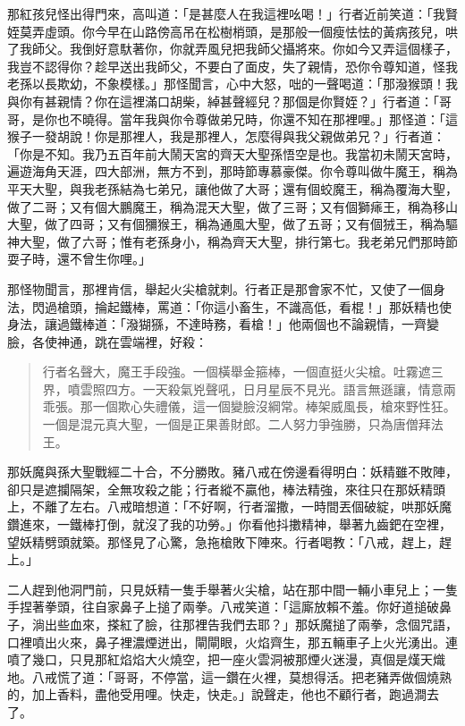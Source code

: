 那紅孩兒怪出得門來，高叫道：「是甚麼人在我這裡吆喝！」行者近前笑道：「我賢姪莫弄虛頭。你今早在山路傍高吊在松樹梢頭，是那般一個瘦怯怯的黃病孩兒，哄了我師父。我倒好意馱著你，你就弄風兒把我師父攝將來。你如今又弄這個樣子，我豈不認得你？趁早送出我師父，不要白了面皮，失了親情，恐你令尊知道，怪我老孫以長欺幼，不象模樣。」那怪聞言，心中大怒，咄的一聲喝道：「那潑猴頭！我與你有甚親情？你在這裡滿口胡柴，綽甚聲經兒？那個是你賢姪？」行者道：「哥哥，是你也不曉得。當年我與你令尊做弟兄時，你還不知在那裡哩。」那怪道：「這猴子一發胡說！你是那裡人，我是那裡人，怎麼得與我父親做弟兄？」行者道：「你是不知。我乃五百年前大鬧天宮的齊天大聖孫悟空是也。我當初未鬧天宮時，遍遊海角天涯，四大部洲，無方不到，那時節專慕豪傑。你令尊叫做牛魔王，稱為平天大聖，與我老孫結為七弟兄，讓他做了大哥；還有個蛟魔王，稱為覆海大聖，做了二哥；又有個大鵬魔王，稱為混天大聖，做了三哥；又有個獅㾩王，稱為移山大聖，做了四哥；又有個獼猴王，稱為通風大聖，做了五哥；又有個狨王，稱為驅神大聖，做了六哥；惟有老孫身小，稱為齊天大聖，排行第七。我老弟兄們那時節耍子時，還不曾生你哩。」

那怪物聞言，那裡肯信，舉起火尖槍就刺。行者正是那會家不忙，又使了一個身法，閃過槍頭，掄起鐵棒，罵道：「你這小畜生，不識高低，看棍！」那妖精也使身法，讓過鐵棒道：「潑猢猻，不達時務，看槍！」他兩個也不論親情，一齊變臉，各使神通，跳在雲端裡，好殺：
\begin{quote}
行者名聲大，魔王手段強。一個橫舉金箍棒，一個直挺火尖槍。吐霧遮三界，噴雲照四方。一天殺氣兇聲吼，日月星辰不見光。語言無遜讓，情意兩乖張。那一個欺心失禮儀，這一個變臉沒綱常。棒架威風長，槍來野性狂。一個是混元真大聖，一個是正果善財郎。二人努力爭強勝，只為唐僧拜法王。
\end{quote}

那妖魔與孫大聖戰經二十合，不分勝敗。豬八戒在傍邊看得明白：妖精雖不敗陣，卻只是遮攔隔架，全無攻殺之能；行者縱不贏他，棒法精強，來往只在那妖精頭上，不離了左右。八戒暗想道：「不好啊，行者溜撒，一時間丟個破綻，哄那妖魔鑽進來，一鐵棒打倒，就沒了我的功勞。」你看他抖擻精神，舉著九齒鈀在空裡，望妖精劈頭就築。那怪見了心驚，急拖槍敗下陣來。行者喝教：「八戒，趕上，趕上。」

二人趕到他洞門前，只見妖精一隻手舉著火尖槍，站在那中間一輛小車兒上；一隻手捏著拳頭，往自家鼻子上搥了兩拳。八戒笑道：「這廝放賴不羞。你好道搥破鼻子，淌出些血來，搽紅了臉，往那裡告我們去耶？」那妖魔搥了兩拳，念個咒語，口裡噴出火來，鼻子裡濃煙迸出，閘閘眼，火焰齊生，那五輛車子上火光湧出。連噴了幾口，只見那紅焰焰大火燒空，把一座火雲洞被那煙火迷漫，真個是熯天熾地。八戒慌了道：「哥哥，不停當，這一鑽在火裡，莫想得活。把老豬弄做個燒熟的，加上香料，盡他受用哩。快走，快走。」說聲走，他也不顧行者，跑過澗去了。

